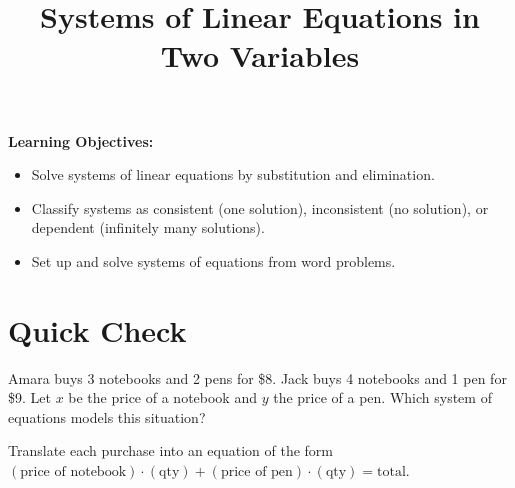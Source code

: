 \documentclass{ximera}
\title{Systems of Linear Equations in Two Variables}
\begin{document}
\begin{abstract}
\end{abstract}
\maketitle

\textbf{Learning Objectives:}
\begin{itemize}
  \item Solve systems of linear equations by substitution and elimination.
  \item Classify systems as consistent (one solution), inconsistent (no solution), or dependent (infinitely many solutions).
  \item Set up and solve systems of equations from word problems.
\end{itemize}
\medskip

\section*{Quick Check}

\begin{problem}
Amara buys 3 notebooks and 2 pens for \$8. Jack buys 4 notebooks and 1 pen for \$9. Let $x$ be the price of a notebook and $y$ the price of a pen. Which system of equations models this situation?
\begin{hint}
Translate each purchase into an equation of the form $(\text{price of notebook})\cdot(\text{qty}) + (\text{price of pen})\cdot(\text{qty}) = \text{total}$.
\end{hint}
\begin{multipleChoice}
\end{multipleChoice}
\end{problem}
\end{document}
